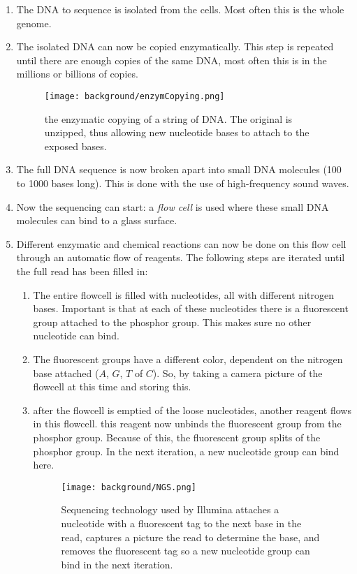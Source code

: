 \begin{enumerate}
	\item The DNA to sequence is isolated from the cells. Most often this is the whole genome.
	\item The isolated DNA can now be copied enzymatically. This step is repeated until there are enough copies of the same DNA, most often this is in the millions or billions of copies.
	
	\begin{figure}[H]
		\centering
		\texttt{[image: background/enzymCopying.png]}
		\caption{the enzymatic copying of a string of DNA. The original is unzipped, thus allowing new nucleotide bases to attach to the exposed bases.}
		\label{fig:enzymCopying}
	\end{figure}
	
	\item The full DNA sequence is now broken apart into small DNA molecules (100 to 1000 bases long). This is done with the use of high-frequency sound waves.
	\item Now the sequencing can start: a \emph{flow cell} is used where these small DNA molecules can bind to a glass surface. 
	\item Different enzymatic and chemical reactions can now be done on this flow cell through an automatic flow of reagents. The following steps are iterated until the full read has been filled in:
	\begin{enumerate}
		\item The entire flowcell is filled with nucleotides, all with different nitrogen bases. Important is that at each of these nucleotides there is a fluorescent group attached to the phosphor group. This makes sure no other nucleotide can bind.
		\item The fluorescent groups have a different color, dependent on the nitrogen base attached ($A$, $G$, $T$ of $C$). So, by taking a camera picture of the flowcell at this time and storing this.
		\item after the flowcell is emptied of the loose nucleotides, another reagent flows in this flowcell. this reagent now unbinds the fluorescent group from the phosphor group. Because of this, the fluorescent group splits of the phosphor group. In the next iteration, a new nucleotide group can bind here.
		
		\begin{figure}[H]
			\centering
			\texttt{[image: background/NGS.png]}
			\caption{Sequencing technology used by Illumina attaches a nucleotide with a fluorescent tag to the next base in the read, captures a picture the read to determine the base, and removes the fluorescent tag so a new nucleotide group can bind in the next iteration.}
			\label{fig:NGS}
		\end{figure}
	\end{enumerate}
	

\end{enumerate}
